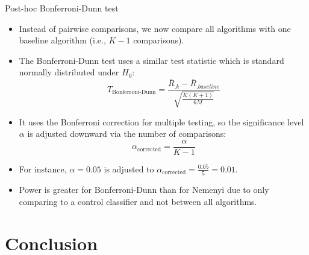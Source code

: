 \documentclass[11pt,compress,t,notes=noshow, aspectratio=169, xcolor=table]{beamer}
\begin{document}
\begin{frame}{Post-hoc Bonferroni-Dunn test}


    \begin{itemize}
    \setlength\itemsep{1em}
    \item Instead of pairwise comparisons, we now compare all algorithms with one baseline algorithm (i.e., $K-1$ comparisons).
    \item The Bonferroni-Dunn test uses a similar test statistic which is standard normally distributed under $H_0$:
    $$
        T_{\text{Bonferroni-Dunn}} = \frac{\bar{R}_{.k} - \bar{R}_{.baseline}}{\sqrt{\frac{K(K+1)}{6M}}}
    $$
     \item It uses the Bonferroni correction for multiple testing, so the significance level $\alpha$ is adjusted downward via the number of comparisons:
     $$
        \alpha_{\text{corrected}} = \frac{\alpha}{K - 1}
     $$
     \item For instance, $\alpha = 0.05$ is adjusted to $\alpha_{\text{corrected}} = \frac{0.05}{5} = 0.01$.
     \item Power is greater for Bonferroni-Dunn than for Nemenyi due to only comparing to a control classifier and not between all algorithms.
     \end{itemize}
\end{frame}

\section{Conclusion}
\end{document}
